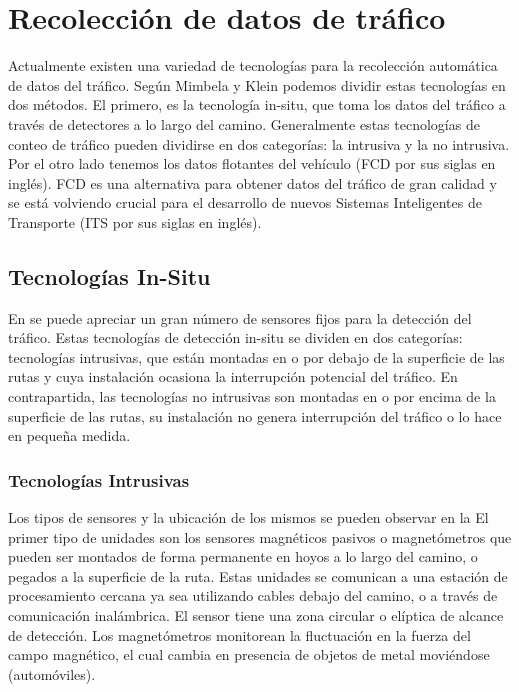 \chapter{Recolección de datos de tráfico}
\label{cap:3}

Actualmente existen una variedad de tecnologías para la recolección automática de datos del tráfico. Según Mimbela y Klein \cite{mimbela2003summary} podemos dividir estas tecnologías en dos métodos. El primero, es la tecnología in-situ, que toma los datos del tráfico a través de detectores a lo largo del camino. Generalmente estas tecnologías de conteo de tráfico pueden dividirse en dos categorías: la intrusiva y la no intrusiva. Por el otro lado tenemos los datos flotantes del vehículo (FCD por sus siglas en inglés). FCD es una alternativa para obtener datos del tráfico de gran calidad y se está volviendo crucial para el desarrollo de nuevos Sistemas Inteligentes de Transporte (ITS por sus siglas en inglés).

\section{Tecnologías In-Situ}

En \cite{klein2006traffic} se puede apreciar un gran número de sensores fijos para la detección del tráfico. Estas tecnologías de detección in-situ se dividen en dos categorías: tecnologías intrusivas, que están montadas en o por debajo de la superficie de las rutas y cuya instalación ocasiona la interrupción potencial del tráfico. En contrapartida, las tecnologías no intrusivas son montadas en o por encima de la superficie de las rutas, su instalación no genera interrupción del tráfico o lo hace en pequeña medida. 

\subsection{Tecnologías Intrusivas}

Los tipos de sensores y la ubicación de los mismos se pueden observar en la  El primer tipo de unidades son los sensores magnéticos pasivos o magnetómetros que pueden ser montados de forma permanente en hoyos a lo largo del camino, o pegados a la superficie de la ruta. Estas unidades se comunican a una estación de procesamiento cercana ya sea utilizando cables debajo del camino, o a través de comunicación inalámbrica. El sensor tiene una zona circular o elíptica de alcance de detección. Los magnetómetros monitorean la fluctuación en la fuerza del campo magnético, el cual cambia en presencia de objetos de metal moviéndose (automóviles).

